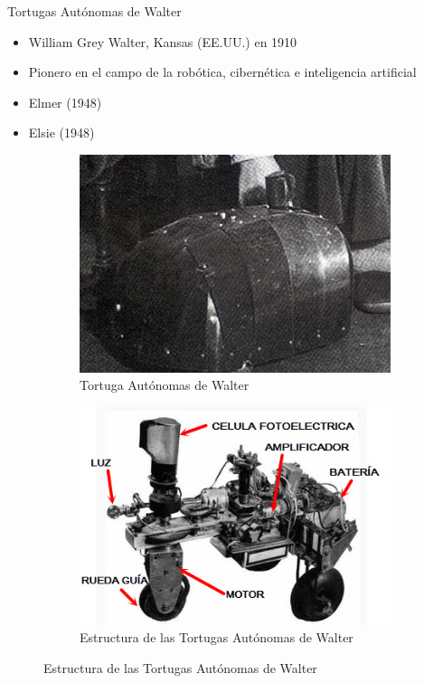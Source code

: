 \begin{frame}[fragile]{Tortugas Autónomas de Walter}
\vspace{8px}
\pause
{}
\begin{block}{}
	\begin{itemize}
		\item William Grey Walter,  Kansas (EE.UU.) en 1910 
		\pause
		\item Pionero en el campo de la robótica, cibernética e inteligencia artificial
		\pause
		\item Elmer (1948)
		\pause
		\item Elsie (1948)
	\end{itemize}
\end{block}
\begin{figure}
		\centering
		\pause
		\begin{subfigure}{0.48\textwidth}
			\centering
			\includegraphics[scale=0.5]{./EtapaPrimeriza/imagenes/tortuga.jpg}
			\caption{Tortuga Autónomas de Walter}
		\end{subfigure}
		\pause
		\begin{subfigure}{0.48\textwidth}
			\centering
			\includegraphics[scale=0.5]{./EtapaPrimeriza/imagenes/t1.jpg}
			\caption{Estructura de las Tortugas Autónomas de Walter }
		\end{subfigure}
	\end{figure}
\end{frame}

